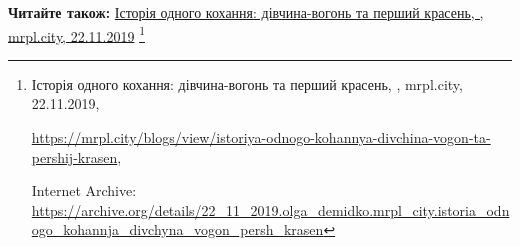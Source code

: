  
 
 
 
 

\def\pubIA{https://archive.org/details/22_11_2019.olga_demidko.mrpl_city.istoria_odnogo_kohannja_divchyna_vogon_persh_krasen}
\def\pubTitle{Історія одного кохання: дівчина-вогонь та перший красень}
\def\pubDate{22.11.2019}
\def\pubOrigin{https://mrpl.city/blogs/view/istoriya-odnogo-kohannya-divchina-vogon-ta-pershij-krasen}
\def\pubAuthor{\pubAuthorDemidko}

\textbf{Читайте також:} \href{\pubIA}{%
\pubTitle, \pubAuthor, mrpl.city, \pubDate}%
\footnote{\pubTitle, \pubAuthor, mrpl.city, \pubDate, \par\url{\pubOrigin}, \par Internet Archive: \url{\pubIA}}
